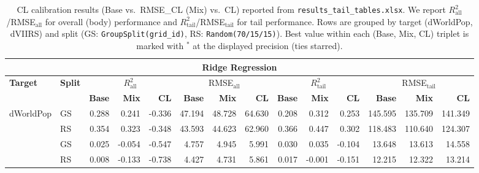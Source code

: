 \documentclass[preprint,12pt]{elsarticle}
\renewcommand{\arraystretch}{1.1}
\newcommand{\bst}{\rlap{$^{*}$}}
\begin{document}
\FloatBarrier
\begin{table}[!htbp]
\centering
\tiny
\setlength{\tabcolsep}{1.8pt}
\renewcommand{\arraystretch}{1.0}
\caption{CL calibration results (Base vs.\ RMSE\_CL (Mix) vs.\ CL) reported from \texttt{results\_tail\_tables.xlsx}. We report $R^2_{\mathrm{all}}$/RMSE$_{\mathrm{all}}$ for overall (body) performance and $R^2_{\mathrm{tail}}$/RMSE$_{\mathrm{tail}}$ for tail performance. Rows are grouped by target (dWorldPop, dVIIRS) and split (GS: \texttt{GroupSplit(grid\_id)}, RS: \texttt{Random(70/15/15)}). Best value within each (Base, Mix, CL) triplet is marked with $^{*}$ at the displayed precision (ties starred).}
\label{tab:cl_wide_blocks}
\begin{tabular*}{0.925\textwidth}{@{\extracolsep{\fill}}ll rrr @{\hspace{4pt}} rrr @{\hspace{4pt}} rrr @{\hspace{4pt}} rrr@{}}
\toprule
\multicolumn{14}{c}{\textbf{Ridge Regression}} \\
\midrule
\multirow{2}{*}{\textbf{Target}} & \multirow{2}{*}{\textbf{Split}} & \multicolumn{3}{c}{$R^2_{\mathrm{all}}$} & \multicolumn{3}{c}{RMSE$_{\mathrm{all}}$} & \multicolumn{3}{c}{$R^2_{\mathrm{tail}}$} & \multicolumn{3}{c}{RMSE$_{\mathrm{tail}}$} \\
\cmidrule(lr){3-5}\cmidrule(lr){6-8}\cmidrule(lr){9-11}\cmidrule(lr){12-14}
 &  & \textbf{Base} & \textbf{Mix} & \textbf{CL} & \textbf{Base} & \textbf{Mix} & \textbf{CL} & \textbf{Base} & \textbf{Mix} & \textbf{CL} & \textbf{Base} & \textbf{Mix} & \textbf{CL} \\
\midrule
\multirow{2}{*}{dWorldPop} & GS
& 0.288\bst & 0.241 & -0.336
& 47.194\bst & 48.728 & 64.630
& 0.208 & 0.312\bst & 0.253
& 145.595 & 135.709\bst & 141.349 \\
 & RS
& 0.354\bst & 0.323 & -0.348
& 43.593\bst & 44.623 & 62.960
& 0.366 & 0.447\bst & 0.302
& 118.483 & 110.640\bst & 124.307 \\
\addlinespace
\multirow{2}{*}{dVIIRS} & GS
& 0.025\bst & -0.054 & -0.547
& 4.757\bst & 4.945 & 5.991
& 0.030 & 0.035\bst & -0.104
& 13.648 & 13.613\bst & 14.558 \\
 & RS
& 0.008\bst & -0.133 & -0.738
& 4.427\bst & 4.731 & 5.861
& 0.017\bst & -0.001 & -0.151
& 12.215\bst & 12.322 & 13.214 \\
\bottomrule
\end{tabular*}


\end{table}
\end{document}
